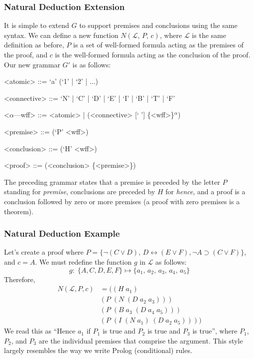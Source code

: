 \documentclass[ms]{uncgdissertationexp2}
\theoremstyle{plain}
\theoremstyle{definition}
\theoremstyle{remark}
\begin{document}
\subsubsection{Natural Deduction Extension} It is simple to extend $G$ to support premises and conclusions using the same syntax. We can define a new function $N(\mathcal{L},\,P,\,c)$, where $\mathcal{L}$ is the same definition as before, $P$ is a set of well-formed formula acting as the premises of the proof, and $c$ is the well-formed formula acting as the conclusion of the proof. Our new grammar $G'$ is as follows:
\begin{grammar}
	<atomic> ::= `a' (`1' | `2' | ...)
	
	<connective> ::= `N' | `C' | `D' | `E' | `I' | `B' | `T' | `F' 
	
	<$\alpha$---wff> ::= <atomic> | (<connective> [` '] \{<wff>\}$^{\alpha}$)
	
	<premise> ::= (`P' <wff>)
	
	<conclusion> ::= (`H' <wff>)
	
	<proof> ::= (<conclusion> \{<premise>\})
\end{grammar}

The preceding grammar states that a premise is preceded by the letter $P$ standing for \textit{premise}, conclusions are preceded by $H$ for \textit{hence}, and a proof is a conclusion followed by zero or more premises (a proof with zero premises is a theorem).\\
\subsubsection{Natural Deduction Example}
Let's create a proof where $P = \{\lnot(C \lor D),\,D \leftrightarrow (E \lor F), \lnot A \supset (C \lor F)\}$, and $c = A$. We must redefine the function $g$ in $\mathcal{L}$ as follows:
\[
	g:\;\{A, C, D, E, F\} \mapsto \{a_1,\,a_2,\,a_3,\,a_4,\,a_5\}
\]
\noindent Therefore, 
\begin{align*}
	N(\mathcal{L}, P, c) & = ((H\;a_1)\;                      \\
	                     & (P\;(N\;(D\;a_2\;a_3)))            \\
	                     & (P\;(B\;a_3\;(D\;a_4\;a_5)))       \\
	                     & (P\;(I\;(N\;a_1)\;(D\;a_2\;a_5))))
\end{align*}
We read this as ``Hence $a_1$ if $P_1$ is true and $P_2$ is true and $P_3$ is true'', where $P_1$, $P_2$, and $P_3$ are the individual premises that comprise the argument. This style largely resembles the way we write Prolog (conditional) rules. 
\end{document}
